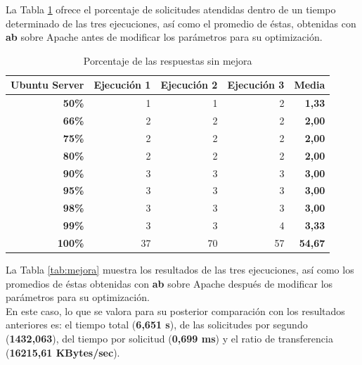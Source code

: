 La Tabla \ref{tab:porcentajeSin} ofrece el porcentaje de solicitudes atendidas dentro de un tiempo determinado de las tres ejecuciones, así como el promedio de éstas, obtenidas con \textbf{ab} sobre Apache antes de modificar los parámetros para su optimización.

\begin{table}[H]
	\centering
	\begin{tabular}{rrrrr}
		\multicolumn{1}{l}{\textbf{Ubuntu Server}} & \multicolumn{1}{l}{\textbf{Ejecución 1}} & \multicolumn{1}{l}{\textbf{Ejecución 2}} & \multicolumn{1}{l}{\textbf{Ejecución 3}} & \multicolumn{1}{l}{\textbf{Media}} \\
		\midrule
		\textbf{50\%} & 1     & 1     & 2     & \textbf{1,33} \\
		\textbf{66\%} & 2     & 2     & 2     & \textbf{2,00} \\
		\textbf{75\%} & 2     & 2     & 2     & \textbf{2,00} \\
		\textbf{80\%} & 2     & 2     & 2     & \textbf{2,00} \\
		\textbf{90\%} & 3     & 3     & 3     & \textbf{3,00} \\
		\textbf{95\%} & 3     & 3     & 3     & \textbf{3,00} \\
		\textbf{98\%} & 3     & 3     & 3     & \textbf{3,00} \\
		\textbf{99\%} & 3     & 3     & 4     & \textbf{3,33} \\
		\textbf{100\%} & 37    & 70    & 57    & \textbf{54,67} \\
	\end{tabular}%
	\caption{Porcentaje de las respuestas sin mejora}
	\label{tab:porcentajeSin}%
\end{table}%

La Tabla \ref{tab:mejora} muestra los resultados de las tres ejecuciones, así como los promedios de éstas obtenidas con \textbf{ab} sobre Apache después de modificar los parámetros para su optimización.
\\

En este caso, lo que se valora para su posterior comparación con los resultados anteriores es: el tiempo total (\textbf{6,651 s}), de las solicitudes por segundo (\textbf{1432,063}), del tiempo por solicitud (\textbf{0,699 ms}) y el ratio de transferencia (\textbf{16215,61 KBytes/sec}).

